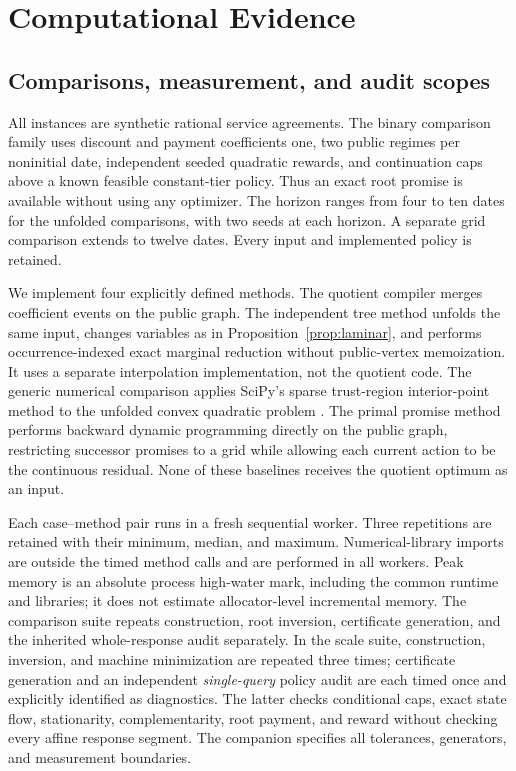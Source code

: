 \section{Computational Evidence}\label{sec:computational}
\subsection{Comparisons, measurement, and audit scopes}
All instances are synthetic rational service agreements. The binary comparison family uses discount and payment coefficients one, two public regimes per noninitial date, independent seeded quadratic rewards, and continuation caps above a known feasible constant-tier policy. Thus an exact root promise is available without using any optimizer. The horizon ranges from four to ten dates for the unfolded comparisons, with two seeds at each horizon. A separate grid comparison extends to twelve dates. Every input and implemented policy is retained.

We implement four explicitly defined methods. The quotient compiler merges coefficient events on the public graph. The independent tree method unfolds the same input, changes variables as in Proposition~\ref{prop:laminar}, and performs occurrence-indexed exact marginal reduction without public-vertex memoization. It uses a separate interpolation implementation, not the quotient code. The generic numerical comparison applies SciPy's sparse trust-region interior-point method to the unfolded convex quadratic problem \citep{Virtanen2020}. The primal promise method performs backward dynamic programming directly on the public graph, restricting successor promises to a grid while allowing each current action to be the continuous residual. None of these baselines receives the quotient optimum as an input.

Each case--method pair runs in a fresh sequential worker. Three repetitions are retained with their minimum, median, and maximum. Numerical-library imports are outside the timed method calls and are performed in all workers. Peak memory is an absolute process high-water mark, including the common runtime and libraries; it does not estimate allocator-level incremental memory. The comparison suite repeats construction, root inversion, certificate generation, and the inherited whole-response audit separately. In the scale suite, construction, inversion, and machine minimization are repeated three times; certificate generation and an independent \emph{single-query} policy audit are each timed once and explicitly identified as diagnostics. The latter checks conditional caps, exact state flow, stationarity, complementarity, root payment, and reward without checking every affine response segment. The companion specifies all tolerances, generators, and measurement boundaries.

